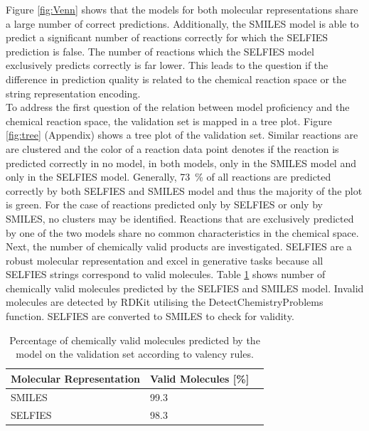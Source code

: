 \documentclass[10pt,conference,compsocconf]{IEEEtran}
\begin{document}
Figure \ref{fig:Venn} shows that the models for both molecular representations share a large number of correct predictions. Additionally, the SMILES model is able to predict a significant number of reactions correctly for which the SELFIES prediction is false. The number of reactions which the SELFIES model exclusively predicts correctly is far lower. This leads to the question if the difference in prediction quality is related to the chemical reaction space or the string representation encoding.\\

To address the first question of the relation between model proficiency and the chemical reaction space, the validation set is mapped in a tree plot\cite{schwaller2020mapping}. Figure \ref{fig:tree} (Appendix) shows a tree plot of the validation set. Similar reactions are are clustered and the color of a reaction data point denotes if the reaction is predicted correctly in no model, in both models, only in the SMILES model and only in the SELFIES model. Generally, 73~\% of all reactions are predicted correctly by both SELFIES and SMILES model and thus the majority of the plot is green. For the case of reactions predicted only by SELFIES or only by SMILES, no clusters may be identified. Reactions that are exclusively predicted by one of the two models share no common characteristics in the chemical space.\\

Next, the number of chemically valid products are investigated. SELFIES are a robust molecular representation and excel in generative tasks because all SELFIES strings correspond to valid molecules. Table \ref{tab:validity} shows number of chemically valid molecules predicted by the SELFIES and SMILES model. Invalid molecules are detected by RDKit utilising the DetectChemistryProblems function. SELFIES are converted to SMILES to check for validity.

\begin{table}[h]
  \centering
  \begin{tabular}[c]{|l|l|l|}
    \hline
    Molecular Representation & Valid Molecules [\%] \\
    \hline
    SMILES & 99.3 \\
    SELFIES & 98.3 \\
    \hline
  \end{tabular}
  \caption{Percentage of chemically valid molecules predicted by the model on the validation set according to valency rules.}
  \label{tab:validity}
\end{table}
\end{document}
